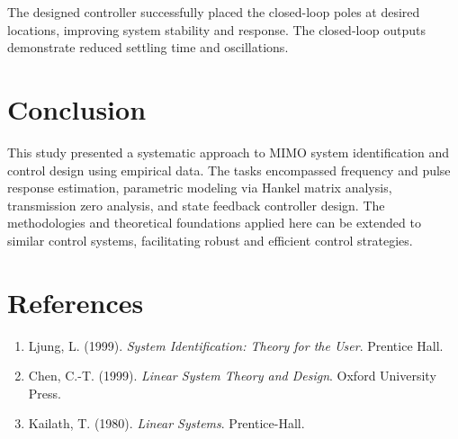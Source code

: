 \documentclass[12pt]{article}
\begin{document}
The designed controller successfully placed the closed-loop poles at desired locations, improving system stability and response. The closed-loop outputs demonstrate reduced settling time and oscillations.

\section{Conclusion}
This study presented a systematic approach to MIMO system identification and control design using empirical data. The tasks encompassed frequency and pulse response estimation, parametric modeling via Hankel matrix analysis, transmission zero analysis, and state feedback controller design. The methodologies and theoretical foundations applied here can be extended to similar control systems, facilitating robust and efficient control strategies.

\section*{References}
\begin{enumerate}
    \item Ljung, L. (1999). \textit{System Identification: Theory for the User}. Prentice Hall.
    \item Chen, C.-T. (1999). \textit{Linear System Theory and Design}. Oxford University Press.
    \item Kailath, T. (1980). \textit{Linear Systems}. Prentice-Hall.
\end{enumerate}
\end{document}

